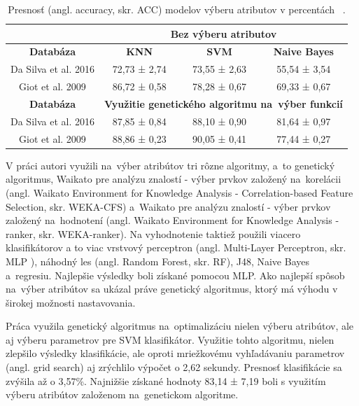 \documentclass[runningheads]{llncs}
\begin{document}
\begin{table}[]
\centering
\caption{Presnosť (angl. accuracy, skr. ACC) modelov výberu atributov v percentách ~\cite{ref_nascimento}.}\label{tab_vyber_funkci}
\begin{tabular}{|c|c|c|c|}
\hline
                     & \multicolumn{3}{c|}{\textbf{Bez výberu atributov}}                     \\ \hline
\textbf{Databáza}    & \textbf{KNN}          & \textbf{SVM}          & \textbf{Naive Bayes} \\ \hline
Da Silva et al. 2016 & 72,73 ± 2,74           & 73,55 ± 2,63           & 55,54 ± 3,54           \\ \hline
Giot et al. 2009     & 86,72 ± 0,58           & 78,28 ± 0,67           & 69,33 ± 0,67          \\ \hline
\textbf{Databáza}    & \multicolumn{3}{c|}{\textbf{Využitie genetického algoritmu na~výber funkcií}} \\ \hline
Da Silva et al. 2016 & 87,85 ± 0,84            & 88,10 ± 0,90           & 81,64 ± 0,97          \\ \hline
Giot et al. 2009     & 88,86 ± 0,23           & 90,05 ± 0,41            & 77,44 ± 0,27          \\ \hline
\end{tabular}
\end{table}


V práci \cite{ref_babatunde} autori využili na~výber atribútov tri rôzne algoritmy, a~to 
genetický algoritmus, Waikato pre analýzu znalostí - výber prvkov založený na~korelácii (angl. Waikato Environment for Knowledge Analysis - Correlation-based Feature Selection, skr. WEKA-CFS) a~Waikato pre analýzu znalostí - výber prvkov založený na~hodnotení (angl. Waikato Environment for Knowledge Analysis - ranker, skr. WEKA-ranker). Na vyhodnotenie taktiež použili viacero klasifikátorov
a to viac vrstvový perceptron (angl. Multi-Layer Perceptron, skr. MLP ), náhodný les (angl. Random Forest, skr. RF), J48, Naive Bayes a~regresiu. Najlepšie výsledky 
boli získané pomocou MLP. Ako najlepší spôsob na~výber atribútov sa ukázal práve genetický algoritmus,
ktorý má výhodu v širokej možnosti nastavovania.

Práca \cite{ref_zhao} využila genetický algoritmus na~optimalizáciu nielen výberu atribútov, 
ale aj výberu parametrov pre SVM klasifikátor. Využitie tohto algoritmu, nielen zlepšilo výsledky klasifikácie, 
ale oproti  
mriežkovému vyhľadávaniu parametrov (angl. grid search) aj zrýchlilo výpočet o 2,62 sekundy.
Presnosť klasifikácie sa zvýšila až o 3,57\%. Najnižšie 
získané hodnoty 83,14 ± 7,19 boli s využitím výberu atribútov založenom na~genetickom algoritme.
\end{document}
